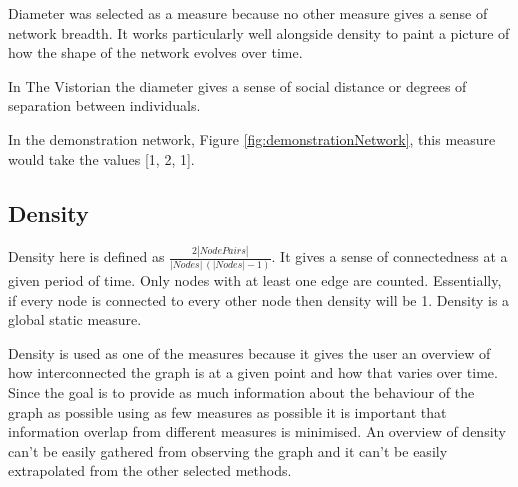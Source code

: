 Diameter was selected as a measure because no other measure gives a sense of network breadth. It works particularly well alongside density to paint a picture of how the shape of the network evolves over time.

In The Vistorian the diameter gives a sense of social distance or degrees of separation between individuals.

In the demonstration network, Figure \ref{fig:demonstrationNetwork}, this measure would take the values [1, 2, 1]. 

\subsection{Density}
Density here is defined as $\frac{2|NodePairs|}{|Nodes|\,(|Nodes|-1)}$. It gives a sense of connectedness at a given period of time. Only nodes with at least one edge are counted. Essentially, if every node is connected to every other node then density will be 1. Density is a global static measure.

Density is used as one of the measures because it gives the user an overview of how interconnected the graph is at a given point and how that varies over time. Since the goal is to provide as much information about the behaviour of the graph as possible using as few measures as possible it is important that information overlap from different measures is minimised. An overview of density can't be easily gathered from observing the graph and it can't be easily extrapolated from the other selected methods.

